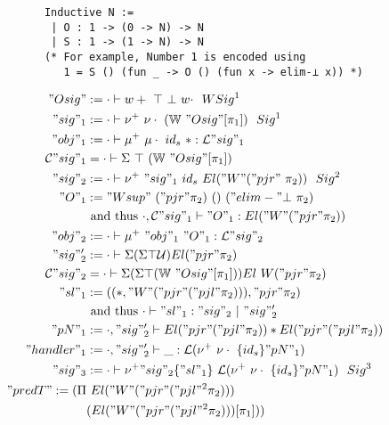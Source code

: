 \begin{figure}
  \begin{minipage}{\linewidth}
    \begin{verbatim}
      Inductive N :=
       | O : 1 -> (0 -> N) -> N 
       | S : 1 -> (1 -> N) -> N
      (* For example, Number 1 is encoded using
         1 = S () (fun _ -> O () (fun x -> elim-⊥ x)) *)
    \end{verbatim}
  \end{minipage}

  \begin{minipage}[t]{0.4\linewidth}
\begin{align*}
  "Osig" &:= \goodWSig{\cdot}{w+ \ \top \ \bot \  w\cdot}{1} \\
  "sig"_1 &:= \goodSig{\cdot}{\nu^+ \ \nu\cdot  \ (\bW \ "Osig"[\pi_1])}{1}  \\
  "obj"_1 &:= \goodTerm{\cdot}{\mu^+ \ \mu\cdot \ {id_s} \ *}{\cL"sig"_1}\\
  \cC"sig"_1 &= \goodType{\cdot}{\Sigma \ \top \ (\bW \ "Osig"[\pi_1]) }{} \\
  "sig"_2 &:=  \goodSig{\cdot}{\nu^+ \ "sig"_1 \ {id_s} \ El ("W" ("pjr" \ \pi_2))}{2} \\ 
  "O"_1 &:= {"Wsup" \ ("pjr" \pi_2) \ () \ ("elim-"\bot \ \pi_2)}  \\ 
  & \text{ and thus }  \goodTerm{\cdot, \cC"sig"_1}{"O"_1}{El ("W" ("pjr" \pi_2))} \\
  "obj"_2 &:= \goodTerm{\cdot}{\mu^+ \ "obj"_1 \ "O"_1}{\cL"sig"_2} \\
  "sig"_2' &:= \goodType{\cdot}{\Sigma (\Sigma \top \cU)El ("pjr" \pi_2)}{} \\ 
  \cC"sig"_2 &= \goodType{\cdot}{\Sigma (\Sigma \top (\bW \ "Osig"[\pi_1]))El \ W("pjr" \pi_2) }{} \\ 
  "sl"_1 &:= ((*, "W" ("pjr" ("pjl" \pi_2)) ), "pjr" \pi_2) \\ 
  & \text{ and thus }  \goodSeal{\cdot}{"sl"_1}{"sig"_2}{"sig"_2'} \\
  "pN"_1 &:= \goodType{\cdot, "sig"_2'}{El ("pjr" ("pjl" \pi_2)) * El ("pjr" ("pjl" \pi_2))}{} \\
  "handler"_1 & := \goodTerm{\cdot, "sig"_2'}{\_}{\cL(\nu^+ \ \nu\cdot \ \{id_s\} "pN"_1)} \\
  "sig"_3 &:= \goodSig{\cdot}{\nu^+ "sig"_2 \{"sl"_1\} \ \cL(\nu^+ \ \nu\cdot \ \{id_s\} "pN"_1)}{3} \\ 
  "predT" := (\Pi & \ El ("W"("pjr" ("pjl"^2 \pi_2))) \\  
  & (El ("W" ("pjr" ("pjl"^2  \pi_2)))[\pi_1])) \\

\end{align*}
\end{minipage}
\end{figure}
